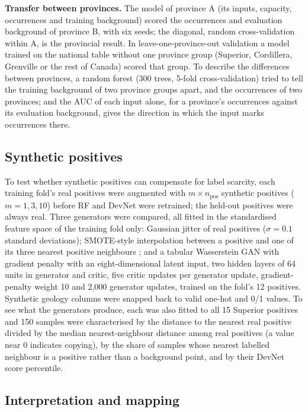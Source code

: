 \documentclass[pdflatex,sn-apa]{sn-jnl}
\begin{document}
\textbf{Transfer between provinces.} The model of province A (its inputs, capacity, occurrences and training background) scored the occurrences and evaluation background of province B, with six seeds; the diagonal, random cross-validation within A, is the provincial result. In leave-one-province-out validation a model trained on the national table without one province group (Superior, Cordillera, Grenville or the rest of Canada) scored that group. To describe the differences between provinces, a random forest (300 trees, 5-fold cross-validation) tried to tell the training background of two province groups apart, and the occurrences of two provinces; and the AUC of each input alone, for a province's occurrences against its evaluation background, gives the direction in which the input marks occurrences there.

\subsection{Synthetic positives}\label{sec:augmentation}

To test whether synthetic positives can compensate for label scarcity, each training fold's real positives were augmented with $m \times n_{\mathrm{pos}}$ synthetic positives ($m = 1, 3, 10$) before RF and DevNet were retrained; the held-out positives were always real. Three generators were compared, all fitted in the standardised feature space of the training fold only: Gaussian jitter of real positives ($\sigma = 0.1$ standard deviations); SMOTE-style interpolation between a positive and one of its three nearest positive neighbours \citep{Chawla2002}; and a tabular Wasserstein GAN with gradient penalty \citep[WGAN-GP;][]{Goodfellow2014,Arjovsky2017,Gulrajani2017} with an eight-dimensional latent input, two hidden layers of 64 units in generator and critic, five critic updates per generator update, gradient-penalty weight 10 and 2,000 generator updates, trained on the fold's 12 positives. Synthetic geology columns were snapped back to valid one-hot and 0/1 values. To see what the generators produce, each was also fitted to all 15 Superior positives and 150 samples were characterised by the distance to the nearest real positive divided by the median nearest-neighbour distance among real positives (a value near 0 indicates copying), by the share of samples whose nearest labelled neighbour is a positive rather than a background point, and by their DevNet score percentile.

\subsection{Interpretation and mapping}\label{sec:shap}
\end{document}
